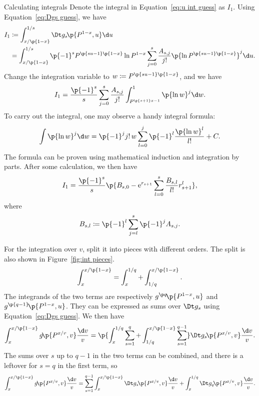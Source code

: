 \documentclass[oneside,12pt,final]{ucthesis-CA2012}
\newcommand{\mrm}[1]{\mathrm{#1}}
\newcommand{\ceq}{\coloneqq}
\newcommand{\e}{\mrm{e}}
\newcommand{\fr}{\frac}
\newcommand{\fc}[2]{#1\mathchoice{\!}{\!}{}{}\p{#2}} %
\begin{document}
\begin{mainmatter}
\begin{section}{Calculating integrals}
Denote the integral in Equation~\ref{eq:u int guess} as $I_1$.
Using Equation~\ref{eq:Dgs guess}, we have
\begin{align*}
	I_1&\ceq\int_{x/\p{1-x}}^{1/s}\fc{\Dt g_s}{P^{1-x},u}\d u\\
	&=\int_{x/\p{1-x}}^{1/s}\p{-1}^s
	P^{\p{su-1}\p{1-x}}\ln P^{1-x}
	\sum_{j=0}^s\fr{A_{s,j}}{j!}\p{\ln P^{\p{su-1}\p{1-x}}}^j\d u.
\end{align*}
Change the integration variable to $w\ceq P^{\p{su-1}\p{1-x}}$, and we have
\[I_1=\fr{\p{-1}^s}s\sum_{j=0}^s\fr{A_{s,j}}{j!}\int_{P^{\p{s+1}x-1}}^1\p{\ln w}^j\d w.\]
To carry out the integral, one may observe a handy integral formula:
\begin{equation}
	\label{eq:handy int}
	\int\p{\ln w}^j\d w=\p{-1}^jj!\,w\sum_{l=0}^j\p{-1}^l\fr{\p{\ln w}^l}{l!}+C.
\end{equation}
The formula can be proven using mathematical induction and integration by parts.
After some calculation, we then have
\begin{equation}
	\label{eq:I1}
	I_1=\fr{\p{-1}^s}s\p{B_{s,0}-\e^{r_{s+1}}\sum_{l=0}^s\fr{B_{s,l}}{l!}r_{s+1}^l},
\end{equation}
where
\begin{equation}
	\label{eq:B}
	B_{s,l}\ceq\p{-1}^l\sum_{j=l}^s\p{-1}^jA_{s,j}.
\end{equation}

For the integration over $v$, split it into pieces with different orders.
The split is also shown in Figure~\ref{fig:int pieces}.
\[\int_x^{x/\p{1-x}}=\int_x^{1/q}+\int_{1/q}^{x/\p{1-x}}.\]
The integrands of the two terms are respectively
$\fc{g^{\p q}}{P^{1-x},u}$ and $\fc{g^{\p{q-1}}}{P^{1-x},u}$.
They can be expressed as sums over $\Dt g_s$ using Equation~\ref{eq:Dgs guess}.
We then have
\[\int_x^{x/\p{1-x}}\fc g{P^{x/v},v}\fr{\d v}v
=\p{\int_x^{1/q}\sum_{s=1}^q+\int_{1/q}^{x/\p{1-x}}\sum_{s=1}^{q-1}}
\fc{\Dt g_s}{P^{x/v},v}\fr{\d v}v.\]
The sums over $s$ up to $q-1$ in the two terms can be combined,
and there is a leftover for $s=q$ in the first term, so
\begin{equation}
	\label{eq:v int guess}
	\int_x^{x/\p{1-x}}\fc g{P^{x/v},v}\fr{\d v}v
	=\sum_{s=1}^{q-1}\int_x^{x/\p{1-x}}\fc{\Dt g_s}{P^{x/v},v}\fr{\d v}v
	+\int_x^{1/q}\fc{\Dt g_q}{P^{x/v},v}\fr{\d v}v.
\end{equation}


\end{section}
\end{mainmatter}
\end{document}
